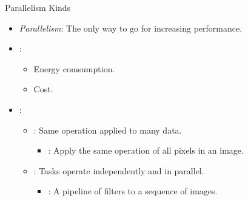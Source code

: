 \begin{frame}[t]{Parallelism Kinds}
\begin{itemize}
  \item \emph{Parallelism}: The only way to go for increasing performance.

  \item {}:
    \begin{itemize}
      \item Energy comsumption.
      \item Cost.
    \end{itemize}

  \item {}:
    \begin{itemize}
      \item {}: Same operation applied to many data.
        \begin{itemize}
          \item {}: Apply the same operation of all pixels in an image.
        \end{itemize}

      \item {}: Tasks operate independently and in parallel.
        \begin{itemize}
          \item {}: A pipeline of filters to a sequence of images.
        \end{itemize}
    \end{itemize}
\end{itemize}
\end{frame}

